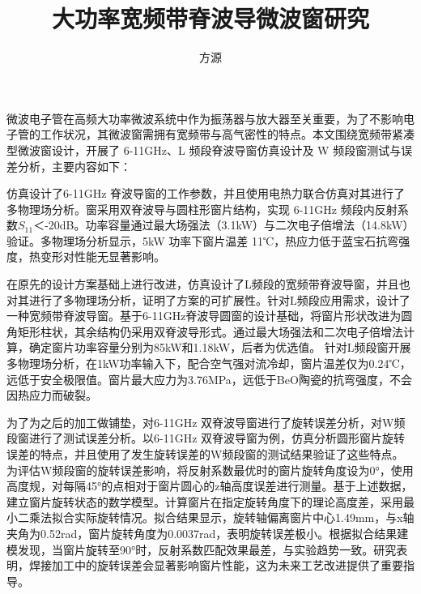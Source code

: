 \documentclass[master]{thesis-uestc}
\title{大功率宽频带脊波导微波窗研究}{Research on High-Power Broadband Ridge Waveguide Microwave Window} %
\author{方源}{Fang Yuan} %
\begin{document}
\makecover %
\originalitydeclaration %
\begin{chineseabstract}
    微波电子管在高频大功率微波系统中作为振荡器与放大器至关重要，为了不影响电子管的工作状况，其微波窗需拥有宽频带与高气密性的特点。本文围绕宽频带紧凑型微波窗设计，开展了 6-11GHz、L 频段脊波导窗仿真设计及 W 频段窗测试与误差分析，主要内容如下：

    仿真设计了6-11GHz 脊波导窗的工作参数，并且使用电热力联合仿真对其进行了多物理场分析。窗采用双脊波导与圆柱形窗片结构，实现 6-11GHz 频段内反射系数\(S_{11}\)＜-20dB。功率容量通过最大场强法（3.1kW）与二次电子倍增法（14.8kW）验证。多物理场分析显示，5kW 功率下窗片温差 11℃，热应力低于蓝宝石抗弯强度，热变形对性能无显著影响。

    在原先的设计方案基础上进行改进，仿真设计了L频段的宽频带脊波导窗，并且也对其进行了多物理场分析，证明了方案的可扩展性。针对L频段应用需求，设计了一种宽频带脊波导窗。基于6-11GHz脊波导圆窗的设计基础，将窗片形状改进为圆角矩形柱状，其余结构仍采用双脊波导形式。通过最大场强法和二次电子倍增法计算，确定窗片功率容量分别为85kW和1.18kW，后者为优选值。
    针对L频段窗开展多物理场分析，在1kW功率输入下，配合空气强对流冷却，窗片温差仅为0.24℃，远低于安全极限值。窗片最大应力为3.76MPa，远低于BeO陶瓷的抗弯强度，不会因热应力而破裂。

    为了为之后的加工做铺垫，对6-11GHz 双脊波导窗进行了旋转误差分析，对W频段窗进行了测试误差分析。以6-11GHz 双脊波导窗为例，仿真分析圆形窗片旋转误差的特点，并且使用了发生旋转误差的W频段窗的测试结果验证了这些特点。为评估W频段窗的旋转误差影响，将反射系数最优时的窗片旋转角度设为0°，使用高度规，对每隔45°的点相对于窗片圆心的z轴高度误差进行测量。基于上述数据，建立窗片旋转状态的数学模型。计算窗片在指定旋转角度下的理论高度差，采用最小二乘法拟合实际旋转情况。拟合结果显示，旋转轴偏离窗片中心1.49mm，与x轴夹角为0.52rad，窗片旋转角度为0.0037rad，表明旋转误差极小。根据拟合结果建模发现，当窗片旋转至90°时，反射系数匹配效果最差，与实验趋势一致。研究表明，焊接加工中的旋转误差会显著影响窗片性能，这为未来工艺改进提供了重要指导。

\end{chineseabstract}
\end{document}

